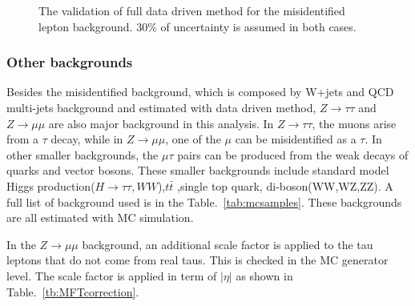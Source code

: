 \begin{figure}[htbp] 
     \centering
     \caption{The validation of full data driven method for the misidentified lepton background. 30\% of uncertainty is assumed in both cases. }
     \label{fig:fakebackgroundValidation}
\end{figure}


\subsubsection{Other backgrounds}
Besides the misidentified background, which is composed by W+jets and QCD multi-jets background and estimated with data driven method, $Z \to \tau\tau$ and $Z \to \mu\mu$ are also major background in this analysis. In $Z \to \tau\tau$, the muons arise from a $\tau$ decay, while in $Z \to \mu\mu$, one of the $\mu$ can be misidentified as a $\tau$. In other smaller backgrounds, the $\mu\tau$ pairs can be produced from the weak decays of quarks and vector bosons. These smaller backgrounds include standard model Higgs production($H \to \tau\tau, WW$),$t\bar{t}$ ,single top quark, di-boson(WW,WZ,ZZ). A full list of background used is in the Table.~\ref{tab:mcsamples}.  These backgrounds are all estimated with MC simulation. 

In the $Z \to \mu\mu$  background, an additional scale factor is applied to the tau leptons that do not come from real taus. This is checked in the MC generator level. The scale factor is applied in term of $|\eta|$ as shown in Table.~\ref{tb:MFTcorrection}.

